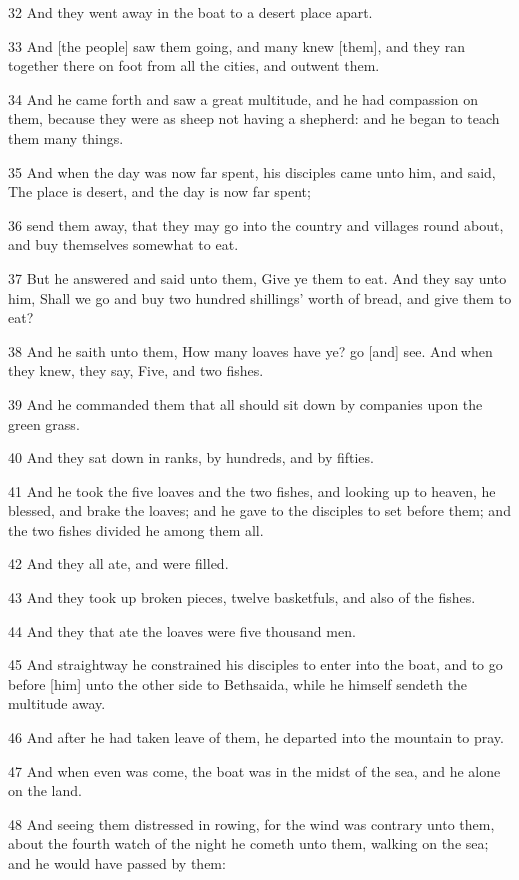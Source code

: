 \par 32 And they went away in the boat to a desert place apart.
\par 33 And [the people] saw them going, and many knew [them], and they ran together there on foot from all the cities, and outwent them.
\par 34 And he came forth and saw a great multitude, and he had compassion on them, because they were as sheep not having a shepherd: and he began to teach them many things.
\par 35 And when the day was now far spent, his disciples came unto him, and said, The place is desert, and the day is now far spent;
\par 36 send them away, that they may go into the country and villages round about, and buy themselves somewhat to eat.
\par 37 But he answered and said unto them, Give ye them to eat. And they say unto him, Shall we go and buy two hundred shillings' worth of bread, and give them to eat?
\par 38 And he saith unto them, How many loaves have ye? go [and] see. And when they knew, they say, Five, and two fishes.
\par 39 And he commanded them that all should sit down by companies upon the green grass.
\par 40 And they sat down in ranks, by hundreds, and by fifties.
\par 41 And he took the five loaves and the two fishes, and looking up to heaven, he blessed, and brake the loaves; and he gave to the disciples to set before them; and the two fishes divided he among them all.
\par 42 And they all ate, and were filled.
\par 43 And they took up broken pieces, twelve basketfuls, and also of the fishes.
\par 44 And they that ate the loaves were five thousand men.
\par 45 And straightway he constrained his disciples to enter into the boat, and to go before [him] unto the other side to Bethsaida, while he himself sendeth the multitude away.
\par 46 And after he had taken leave of them, he departed into the mountain to pray.
\par 47 And when even was come, the boat was in the midst of the sea, and he alone on the land.
\par 48 And seeing them distressed in rowing, for the wind was contrary unto them, about the fourth watch of the night he cometh unto them, walking on the sea; and he would have passed by them:
